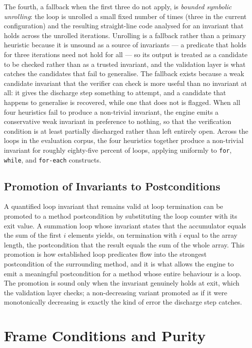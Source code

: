 The fourth, a fallback when the first three do not apply, is \emph{bounded
symbolic unrolling}: the loop is unrolled a small fixed number of times (three
in the current configuration) and the resulting straight-line code analysed for
an invariant that holds across the unrolled iterations. Unrolling is a fallback
rather than a primary heuristic because it is unsound as a source of invariants ---
a predicate that holds for three iterations need not hold for all --- so its output
is treated as a candidate to be checked rather than as a trusted invariant, and the
validation layer is what catches the candidates that fail to generalise. The
fallback exists because a weak candidate invariant that the verifier can check is
more useful than no invariant at all: it gives the discharge step something to
attempt, and a candidate that happens to generalise is recovered, while one that
does not is flagged. When all four
heuristics fail to produce a non-trivial invariant, the engine emits a
conservative weak invariant in preference to nothing, so that the verification
condition is at least partially discharged rather than left entirely open.
Across the loops in the evaluation corpus, the four heuristics together produce
a non-trivial invariant for roughly eighty-five percent of loops, applying
uniformly to \texttt{for}, \texttt{while}, and \texttt{for-each} constructs.

\subsection{Promotion of Invariants to Postconditions}

A quantified loop invariant that remains valid at loop termination can be
promoted to a method postcondition by substituting the loop counter with its
exit value. A summation loop whose invariant states that the accumulator equals
the sum of the first $i$ elements yields, on termination with $i$ equal to the
array length, the postcondition that the result equals the sum of the whole
array. This promotion is how established loop predicates flow into the
strongest postcondition of the surrounding method, and it is what allows the
engine to emit a meaningful postcondition for a method whose entire behaviour
is a loop. The promotion is sound only when the invariant genuinely holds at
exit, which the validation layer checks; a non-decreasing variant promoted as
if it were monotonically decreasing is exactly the kind of error the discharge
step catches.

\section{Frame Conditions and Purity}
\label{sec:inf-frame}

